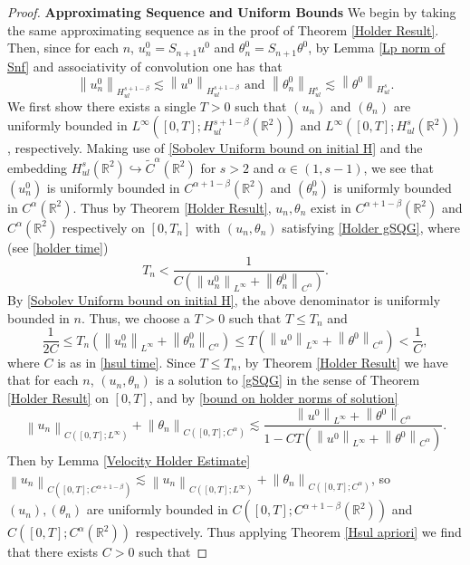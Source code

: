 \documentclass[12pt,xcolor=svgnames]{amsart}
\newcommand{\R}{\mathbb{R}}
\newcommand{\norm}[2]{\left\lVert#1\right\rVert_{#2}}
\begin{document}
\begin{proof}
\textbf{Approximating Sequence and Uniform Bounds}
We begin by taking the same approximating sequence as in the proof of Theorem \ref{Holder Result}. Then, since for each $n$, $u_n^0=S_{n 
 +1}u^0$ and $\theta_n^0=S_{n+1}\theta^0$, by Lemma \ref{Lp norm of Snf} and associativity of convolution one has that 
\begin{equation}
\label{Sobolev Uniform bound on initial H}
\norm{u_n^0}{H_{ul}^{s+1-\beta}} \lesssim \norm{u^0}{H_{ul}^{s+1-\beta}} \text{  and  } 
\norm{\theta_n^0}{H_{ul}^s} \lesssim \norm{\theta^0}{H_{ul}^s}.
\end{equation}
We first show there exists a single $T>0$ such that $(u_n)$ and $(\theta_n)$ are uniformly bounded in $L^{\infty}([0,T];H_{ul}^{s+1-\beta}(\R^2))$ and $L^{\infty}([0,T];H_{ul}^s(\R^2))$, respectively. Making use of \eqref{Sobolev Uniform bound on initial H} and the embedding $H_{ul}^{s}(\R^2) \hookrightarrow \tilde{C}^{\alpha}(\R^2)$ for $s>2$ and $\alpha \in (1,s-1)$, we see that $(u_n^0)$ is uniformly bounded in $C^{\alpha+1-\beta}(\R^2)$ and $(\theta_n^0)$ is uniformly bounded in $C^{\alpha}(\R^2)$. Thus by Theorem \ref{Holder Result}, $u_n,\theta_n$ exist in $C^{\alpha+1-\beta}(\R^2)$ and $C^{\alpha}(\R^2)$ respectively on $[0,T_n]$ with $(u_n,\theta_n)$ satisfying \eqref{Holder gSQG}, where (see \eqref{holder time})
\begin{equation}
\label{hsul time}
T_n < \frac{1}{C(\norm{u_n^0}{L^{\infty}} + \norm{\theta_n^0}{C^{\alpha}})}.
\end{equation}
By \eqref{Sobolev Uniform bound on initial H}, the above denominator is uniformly bounded in $n$. Thus, we choose a $T>0$ such that $T\leq T_n$ and
$$
\frac{1}{2C} \leq T_n(\norm{u_n^0}{L^{\infty}}+\norm{\theta_n^0}{C^{\alpha}})\leq T(\norm{u^0}{L^{\infty}}+\norm{\theta^0}{C^{\alpha}}) < \frac{1}{C},
$$
where $C$ is as in \eqref{hsul time}. Since $T\leq T_n$, by Theorem \ref{Holder Result} we have that for each $n$, $(u_n,\theta_n)$ is a solution to \eqref{gSQG} in the sense of Theorem \ref{Holder Result} on $[0,T]$, and by \eqref{bound on holder norms of solution}
$$
\norm{u_n}{C([0,T];L^{\infty})}+\norm{\theta_n}{C([0,T];C^{\alpha})} \lesssim \frac{\norm{u^0}{L^{\infty}}+\norm{\theta^0}{C^{\alpha}}}{1-CT(\norm{u^0}{L^{\infty}}+\norm{\theta^0}{C^{\alpha}})}.
$$
Then by Lemma \ref{Velocity Holder Estimate} $\norm{u_n}{C([0,T];C^{\alpha+1-\beta})}\lesssim \norm{u_n}{C([0,T];L^{\infty})}+\norm{\theta_n}{C([0,T];C^{\alpha})}$, so $(u_n),(\theta_n)$ are uniformly bounded in $C([0,T];C^{\alpha+1-\beta}(\R^2))$ and $C([0,T];C^{\alpha}(\R^2))$ respectively. Thus applying Theorem \ref{Hsul apriori} we find that there exists $C>0$ such that

\end{proof}
\end{document}
